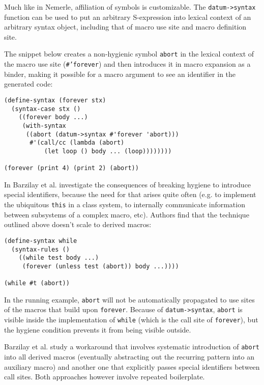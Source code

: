 \documentclass[10pt,journal,a4paper]{IEEEtran}
\begin{document}
Much like in Nemerle, affiliation of symbols is customizable. The \small \texttt{datum->syntax} \normalsize
function can be used to put an arbitrary S-expression into lexical context of an arbitrary syntax object,
including that of macro use site and macro definition site.

The snippet below creates a non-hygienic symbol \small \texttt{abort} \normalsize in the lexical context
of the macro use site (\small \texttt{\#'forever}\normalsize) and then introduces it in macro expansion
as a binder, making it possible for a macro argument to see an identifier in the generated code:

\small
\begin{verbatim}
(define-syntax (forever stx)
  (syntax-case stx ()
    ((forever body ...)
     (with-syntax
      ((abort (datum->syntax #'forever 'abort)))
       #'(call/cc (lambda (abort)
           (let loop () body ... (loop))))))))

(forever (print 4) (print 2) (abort))
\end{verbatim}
\normalsize

In \cite{barzilay11} Barzilay et al. investigate the consequences of breaking hygiene to introduce
special identifiers, because
the need for that arises quite often (e.g. to implement the ubiquitous \small \texttt{this} \normalsize
in a class system, to internally communicate information between subsystems of a complex macro, etc).
Authors find that the technique outlined above doesn't scale to derived macros:

\small
\begin{verbatim}
(define-syntax while
  (syntax-rules ()
    ((while test body ...)
     (forever (unless test (abort)) body ...))))

(while #t (abort))
\end{verbatim}
\normalsize

In the running example,
\small \texttt{abort} \normalsize will not be automatically propagated to use sites of
the macros that build upon \small \texttt{forever}\normalsize.
Because of \small \texttt{datum->syntax}\normalsize,
\small \texttt{abort} \normalsize is visible inside the implementation of \small \texttt{while} \normalsize
(which is the call site of \small \texttt{forever}\normalsize), but the hygiene condition prevents it
from being visible outside.

Barzilay et al. study a workaround
that involves systematic introduction of \small \texttt{abort} \normalsize into all derived macros
(eventually abstracting out the recurring pattern into an auxiliary macro) and another one that
explicitly passes special identifiers between call sites. Both approaches however involve
repeated boilerplate.
\end{document}
